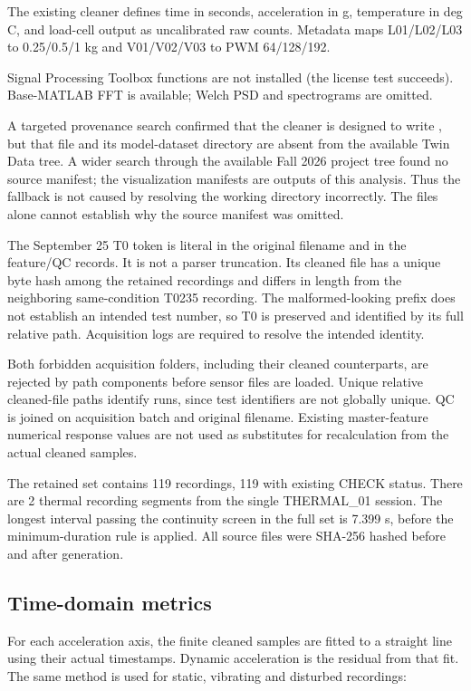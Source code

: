\documentclass[10pt,letterpaper]{article}
\begin{document}
The existing cleaner defines time in seconds, acceleration in g, temperature in deg C, and load-cell output as uncalibrated raw counts. Metadata maps L01/L02/L03 to 0.25/0.5/1 kg and V01/V02/V03 to PWM 64/128/192.

Signal Processing Toolbox functions are not installed (the license test succeeds). Base-MATLAB FFT is available; Welch PSD and spectrograms are omitted.

A targeted provenance search confirmed that the cleaner is designed to write , but that file and its model-dataset directory are absent from the available Twin Data tree. A wider search through the available Fall 2026 project tree found no source manifest; the visualization manifests are outputs of this analysis. Thus the fallback is not caused by resolving the working directory incorrectly. The files alone cannot establish why the source manifest was omitted.

The September 25 T0 token is literal in the original  filename and in the feature/QC records. It is not a parser truncation. Its cleaned file has a unique byte hash among the retained recordings and differs in length from the neighboring same-condition T0235 recording. The malformed-looking prefix does not establish an intended test number, so T0 is preserved and identified by its full relative path. Acquisition logs are required to resolve the intended identity.

Both forbidden acquisition folders, including their cleaned counterparts, are rejected by path components before sensor files are loaded. Unique relative cleaned-file paths identify runs, since test identifiers are not globally unique. QC is joined on acquisition batch and original filename. Existing master-feature numerical response values are not used as substitutes for recalculation from the actual cleaned samples.

The retained set contains 119 recordings, 119 with existing CHECK status. There are 2 thermal recording segments from the single THERMAL\_01 session. The longest interval passing the continuity screen in the full set is 7.399 s, before the minimum-duration rule is applied. All source files were SHA-256 hashed before and after generation.

\subsection*{Time-domain metrics}
For each acceleration axis, the finite cleaned samples are fitted to a straight line using their actual timestamps. Dynamic acceleration is the residual from that fit. The same method is used for static, vibrating and disturbed recordings:
\end{document}
